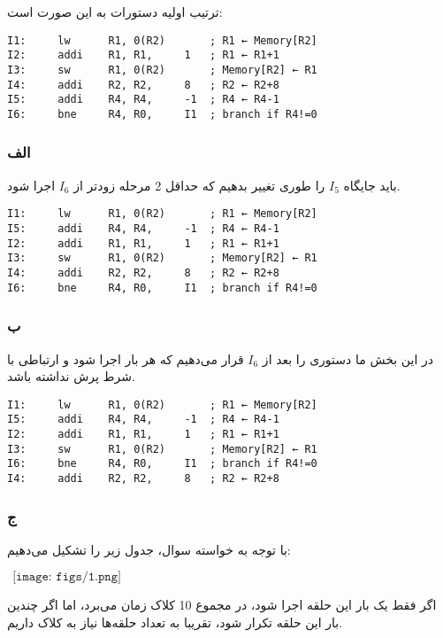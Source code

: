 ترتیب اولیه دستورات به این صورت است:

\setLTR
\begin{lstlisting}
I1:     lw      R1, 0(R2)       ; R1 ← Memory[R2]
I2:     addi    R1, R1,     1   ; R1 ← R1+1
I3:     sw      R1, 0(R2)       ; Memory[R2] ← R1
I4:     addi    R2, R2,     8   ; R2 ← R2+8
I5:     addi    R4, R4,     -1  ; R4 ← R4-1
I6:     bne     R4, R0,     I1  ; branch if R4!=0
\end{lstlisting}
\setRTL

\subsubsection*{الف}
باید جایگاه
$I_5$
را طوری تغییر بدهیم که حداقل 2 مرحله زودتر از 
$I_6$
اجرا شود.

\setLTR
\begin{lstlisting}
I1:     lw      R1, 0(R2)       ; R1 ← Memory[R2]
I5:     addi    R4, R4,     -1  ; R4 ← R4-1
I2:     addi    R1, R1,     1   ; R1 ← R1+1
I3:     sw      R1, 0(R2)       ; Memory[R2] ← R1
I4:     addi    R2, R2,     8   ; R2 ← R2+8
I6:     bne     R4, R0,     I1  ; branch if R4!=0
\end{lstlisting}
\setRTL

\subsubsection*{ب}
در این بخش ما دستوری را بعد از 
$I_6$
قرار می‌دهیم که هر بار اجرا شود و ارتباطی با شرط پرش نداشته باشد.

\setLTR
\begin{lstlisting}
I1:     lw      R1, 0(R2)       ; R1 ← Memory[R2]
I5:     addi    R4, R4,     -1  ; R4 ← R4-1
I2:     addi    R1, R1,     1   ; R1 ← R1+1
I3:     sw      R1, 0(R2)       ; Memory[R2] ← R1
I6:     bne     R4, R0,     I1  ; branch if R4!=0
I4:     addi    R2, R2,     8   ; R2 ← R2+8
\end{lstlisting}
\setRTL

\subsubsection*{ج}

با توجه به خواسته سوال، جدول زیر را تشکیل می‌دهیم:
\setLTR

$ \ \ \texttt{[image: figs/1.png]}$

\setRTL

اگر فقط یک بار این حلقه اجرا شود، در مجموع 10 کلاک زمان می‌برد، اما اگر چندین بار این حلقه تکرار شود، تقریبا به تعداد حلقه‌ها نیاز به کلاک داریم.




